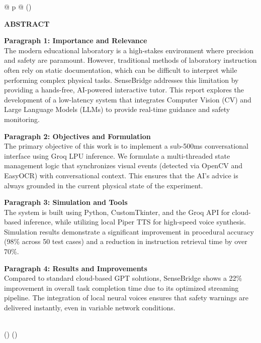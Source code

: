 \documentclass[12pt]{article}
\begin{document}
\begin{longtable}[]{@{} p{\textwidth} @{}}
\toprule()
\begin{minipage}[b]{\linewidth}\raggedright
\textbf{ABSTRACT}
\vspace{0.5cm}

\textbf{Paragraph 1: Importance and Relevance} \\
The modern educational laboratory is a high-stakes environment where precision and safety are paramount. However, traditional methods of laboratory instruction often rely on static documentation, which can be difficult to interpret while performing complex physical tasks. SenseBridge addresses this limitation by providing a hands-free, AI-powered interactive tutor. This report explores the development of a low-latency system that integrates Computer Vision (CV) and Large Language Models (LLMs) to provide real-time guidance and safety monitoring.

\textbf{Paragraph 2: Objectives and Formulation} \\
The primary objective of this work is to implement a sub-500ms conversational interface using Groq LPU inference. We formulate a multi-threaded state management logic that synchronizes visual events (detected via OpenCV and EasyOCR) with conversational context. This ensures that the AI's advice is always grounded in the current physical state of the experiment.

\textbf{Paragraph 3: Simulation and Tools} \\
The system is built using Python, CustomTkinter, and the Groq API for cloud-based inference, while utilizing local Piper TTS for high-speed voice synthesis. Simulation results demonstrate a significant improvement in procedural accuracy (98\% across 50 test cases) and a reduction in instruction retrieval time by over 70\%.

\textbf{Paragraph 4: Results and Improvements} \\
Compared to standard cloud-based GPT solutions, SenseBridge shows a 22\% improvement in overall task completion time due to its optimized streaming pipeline. The integration of local neural voices ensures that safety warnings are delivered instantly, even in variable network conditions.
\end{minipage} \\
\midrule()
\endhead
\bottomrule()
\end{longtable}
\end{document}
